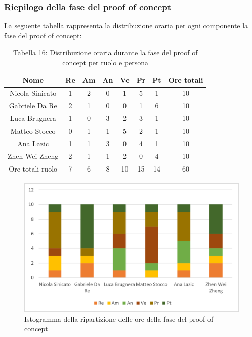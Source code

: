\subsubsection{Riepilogo della fase del proof of concept}
%
La seguente tabella rappresenta la distribuzione oraria per ogni componente la fase del proof of concept:
\begin{table}[h]
	\setlength\extrarowheight{5pt}
	\centering
	\begin{tabularx}{\textwidth}{|ccccccc|c|}
		\hline
		\rowcolor{white}
		\textbf{Nome} & \textbf{Re} & \textbf{Am} & \textbf{An} & \textbf{Ve} & \textbf{Pr}& \textbf{Pt} & \textbf{Ore totali} \\
		\hline
		Nicola Sinicato &1&2&0&1&5&1&10 \\
		Gabriele Da Re &2&1&0&0&1&6&10 \\
		Luca Brugnera &1&0&3&2&3&1&10 \\
		Matteo Stocco &0&1&1&5&2&1&10 \\
		Ana Lazic &1&1&3&0&4&1&10 \\
		Zhen Wei Zheng &2&1&1&2&0&4&10 \\
		\hline
		Ore totali ruolo &7&6&8&10&15&14&60 \\
		\hline
	\end{tabularx}
	\vspace{10pt}
	\caption{Tabella 16: Distribuzione oraria durante la fase del proof of concept per ruolo e persona}
\end{table}
\begin{figure}[H]
    \centering
    \includegraphics[scale=0.6]{img/grafi preventivo/istogrammi/proof/complessivo.png}
    \caption{Istogramma della ripartizione delle ore della fase del proof of concept}
\end{figure}
